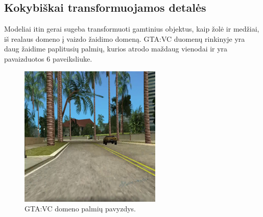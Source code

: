 \documentclass{VUMIFPSkursinis}
\begin{document}
        \subsection{Kokybiškai transformuojamos detalės}
            Modeliai itin gerai sugeba transformuoti gamtinius objektus, kaip žolė ir medžiai, iš realaus domeno į vaizdo žaidimo domeną. GTA:VC duomenų rinkinyje yra daug žaidime paplitusių palmių, kurios atrodo maždaug vienodai ir yra pavaizduotos 6 paveiksliuke.
            \begin{figure}[H]
                \centering
                \includegraphics[scale=0.7]{img/palmiu_pvz}
                \caption{GTA:VC domeno palmių pavyzdys.}
                \label{img:mlp}
            \end{figure}
    
\end{document}
